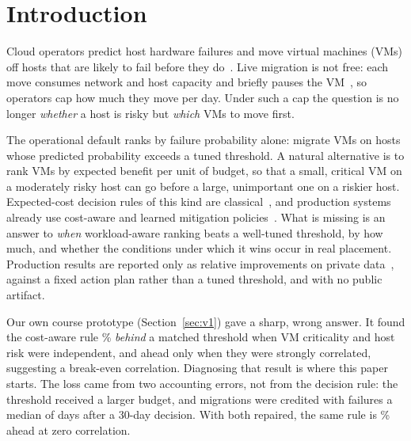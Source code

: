 \section{Introduction}
\label{sec:intro}

Cloud operators predict host hardware failures and move virtual machines (VMs) off hosts that are
likely to fail before they do~\cite{levy2020narya,xu2018cdef}. Live migration is not free: each
move consumes network and host capacity and briefly pauses the VM~\cite{clark2005live}, so
operators cap how much they move per day. Under such a cap the question is no longer \emph{whether}
a host is risky but \emph{which} VMs to move first.

The operational default ranks by failure probability alone: migrate VMs on hosts whose predicted
probability exceeds a tuned threshold. A natural alternative is to rank VMs by expected benefit
per unit of budget, so that a small, critical VM on a moderately risky host can go before a large,
unimportant one on a riskier host. Expected-cost decision rules of this kind are
classical~\cite{elkan2001foundations}, and production systems already use cost-aware and learned
mitigation policies~\cite{levy2020narya,wang2022nenya,zhang2024deoxys}. What is missing is an
answer to \emph{when} workload-aware ranking beats a well-tuned threshold, by how much, and
whether the conditions under which it wins occur in real placement. Production results are
reported only as relative improvements on private data~\cite{levy2020narya}, against a fixed
action plan rather than a tuned threshold, and with no public artifact.

Our own course prototype (Section~\ref{sec:v1}) gave a sharp, wrong answer. It found the
cost-aware rule \VVOneAdvRandom\% \emph{behind} a matched threshold when VM criticality and host
risk were independent, and ahead only when they were strongly correlated, suggesting a break-even
correlation. Diagnosing that result is where this paper starts. The loss came from two accounting
errors, not from the decision rule: the threshold received a larger budget, and migrations were
credited with failures a median of \VVOneMedianLeadDays{} days after a 30-day decision. With both
repaired, the same rule is \VVOneAdvAligned\% ahead at zero correlation.

